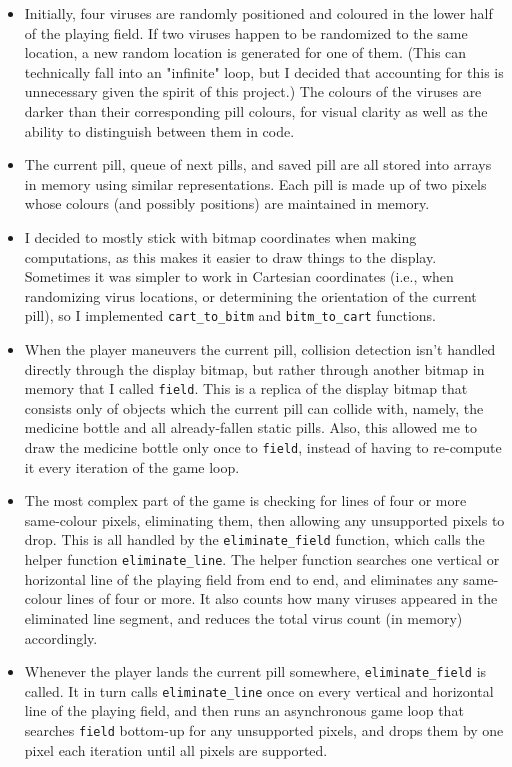 \documentclass{article}
\begin{document}
\begin{enumerate}[(I)]
\begin{itemize}
\item Initially, four viruses are randomly positioned and coloured in the lower half of the playing field. If two viruses happen to be randomized to the same location, a new random location is generated for one of them. (This can technically fall into an "infinite" loop, but I decided that accounting for this is unnecessary given the spirit of this project.) The colours of the viruses are darker than their corresponding pill colours, for visual clarity as well as the ability to distinguish between them in code.
\item The current pill, queue of next pills, and saved pill are all stored into arrays in memory using similar representations. Each pill is made up of two pixels whose colours (and possibly positions) are maintained in memory.
\item I decided to mostly stick with bitmap coordinates when making computations, as this makes it easier to draw things to the display. Sometimes it was simpler to work in Cartesian coordinates (i.e., when randomizing virus locations, or determining the orientation of the current pill), so I implemented \texttt{cart\_to\_bitm} and \texttt{bitm\_to\_cart} functions.
\item When the player maneuvers the current pill, collision detection isn't handled directly through the display bitmap, but rather through another bitmap in memory that I called \texttt{field}. This is a replica of the display bitmap that consists only of objects which the current pill can collide with, namely, the medicine bottle and all already-fallen static pills. Also, this allowed me to draw the medicine bottle only once to \texttt{field}, instead of having to re-compute it every iteration of the game loop.
\item The most complex part of the game is checking for lines of four or more same-colour pixels, eliminating them, then allowing any unsupported pixels to drop. This is all handled by the \texttt{eliminate\_field} function, which calls the helper function \texttt{eliminate\_line}. The helper function searches one vertical or horizontal line of the playing field from end to end, and eliminates any same-colour lines of four or more. It also counts how many viruses appeared in the eliminated line segment, and reduces the total virus count (in memory) accordingly.
\item Whenever the player lands the current pill somewhere, \texttt{eliminate\_field} is called. It in turn calls \texttt{eliminate\_line} once on every vertical and horizontal line of the playing field, and then runs an asynchronous game loop that searches \texttt{field} bottom-up for any unsupported pixels, and drops them by one pixel each iteration until all pixels are supported.
\end{itemize}

\end{enumerate}
\end{document}
